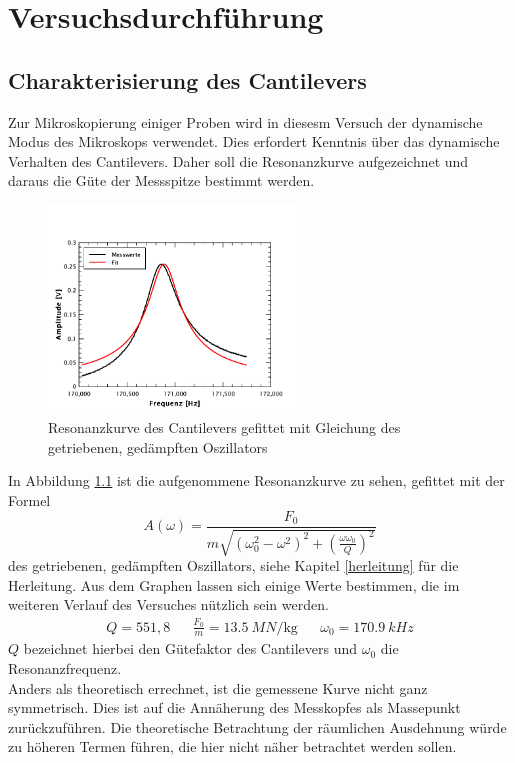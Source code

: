 \chapter{Versuchsdurchführung}

    \section{Charakterisierung des Cantilevers}

Zur Mikroskopierung einiger Proben wird in diesesm Versuch der dynamische Modus des
Mikroskops verwendet. Dies erfordert Kenntnis über das dynamische Verhalten des 
Cantilevers. Daher soll die Resonanzkurve aufgezeichnet und daraus die Güte der
Messspitze bestimmt werden. \par
\begin{figure}[hb]
    \centering
    \includegraphics[width=0.6\textwidth]{Mess/freqsweep_2.pdf}
    \caption{Resonanzkurve des Cantilevers gefittet mit Gleichung des getriebenen,
             gedämpften Oszillators}
    \label{freqsweep}
\end{figure}
In Abbildung \ref{freqsweep} ist die aufgenommene Resonanzkurve zu sehen, gefittet
mit der Formel
\[
    A(\omega) = \frac{F_0}{m \sqrt{(\omega_0^2 - \omega^2)^2 + \left( 
    \frac{\omega\omega_0}{Q} \right)^2} }
\]
des getriebenen, gedämpften Oszillators, siehe Kapitel \ref{herleitung} für die 
Herleitung. Aus dem Graphen lassen sich einige Werte
bestimmen, die im weiteren Verlauf des Versuches nützlich sein werden.
\begin{align*}
    Q=551,8 & & \frac{F_0}{m} = \SI{13,5}{MN\per\kg} & & \omega_0 =
    \SI{170,9}{kHz}
\end{align*}
$Q$ bezeichnet hierbei den Gütefaktor des Cantilevers und $\omega_0$ die 
Resonanzfrequenz. 
\vspace{6pt}\\
Anders als theoretisch errechnet, ist die gemessene Kurve nicht ganz symmetrisch.
Dies ist auf die Annäherung des Messkopfes als Massepunkt zurückzuführen. Die 
theoretische Betrachtung der räumlichen Ausdehnung würde zu höheren Termen führen,
die hier nicht näher betrachtet werden sollen.

